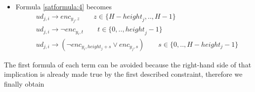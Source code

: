 \begin{itemize}
    \item Formula \ref{satformula:4} becomes
        \begin{equation}\label{satformula:4_mod}
        \begin{aligned}
            &ud_{j,i} \rightarrow {enc}_{y_{j},z} \qquad z \in \{ H-{height}_j,..,H-1 \}
            \\
            &ud_{j,i} \rightarrow \neg{enc}_{y_{i},t} \qquad t \in \{ 0,.., {height}_j -1\}
            \\
            &ud_{j,i} \rightarrow (\neg {enc}_{y_{i},height_{j}+s} \vee enc_{y_{j},s}) \qquad s \in \{ 0,.., H-height_j-1\}
        \end{aligned}
        \end{equation}
\end{itemize}
\noindent
The first formula of each term can be avoided because the right-hand side of that implication is already made true by the first described constraint, therefore we finally obtain 
